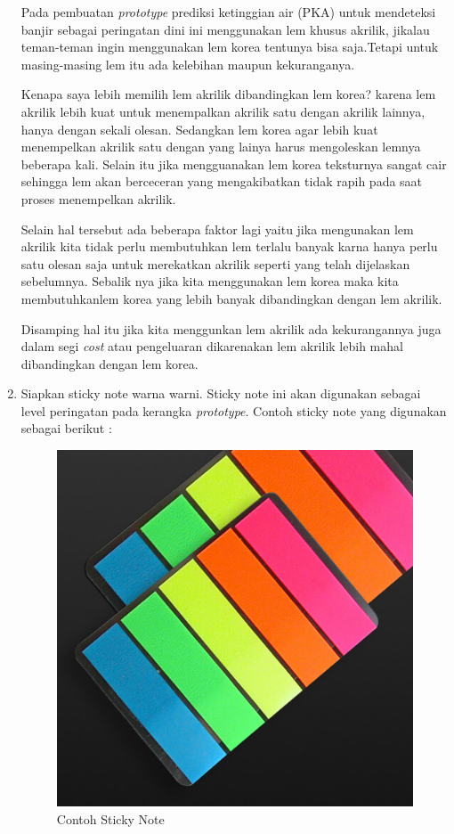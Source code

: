 \begin{enumerate}
\par Pada pembuatan \textit{prototype} prediksi ketinggian air (PKA) untuk mendeteksi banjir sebagai peringatan dini ini menggunakan lem khusus akrilik, jikalau teman-teman ingin menggunakan lem korea tentunya bisa saja.Tetapi untuk masing-masing lem itu ada kelebihan maupun kekuranganya. 

\par Kenapa saya lebih memilih lem akrilik dibandingkan lem korea? karena lem akrilik lebih kuat untuk menempalkan akrilik satu dengan akrilik lainnya, hanya dengan sekali olesan. Sedangkan lem korea agar lebih kuat menempelkan akrilik satu dengan yang lainya harus mengoleskan lemnya beberapa kali. Selain itu jika mengguanakan lem korea teksturnya sangat cair sehingga lem akan berceceran yang mengakibatkan tidak rapih pada saat proses menempelkan akrilik.

\par Selain hal tersebut ada beberapa faktor lagi yaitu  jika mengunakan lem akrilik kita tidak perlu membutuhkan lem terlalu banyak karna hanya perlu satu olesan saja untuk merekatkan akrilik seperti yang telah dijelaskan sebelumnya. Sebalik nya jika kita menggunakan lem korea maka kita membutuhkanlem korea yang lebih banyak dibandingkan dengan lem akrilik. 

\par Disamping hal itu jika kita menggunkan lem akrilik ada kekurangannya juga dalam segi \textit{cost} atau pengeluaran dikarenakan lem akrilik lebih mahal dibandingkan dengan lem korea.


\item Siapkan sticky note warna warni. Sticky note ini akan digunakan sebagai level peringatan pada kerangka \textit{prototype}. Contoh sticky note yang digunakan sebagai berikut :
\begin{figure}[H]
\centering
\includegraphics[width=1\textwidth]{figures/note.jpg}
\caption{Contoh Sticky Note}
\label{print}
\end{figure}


\end{enumerate}
